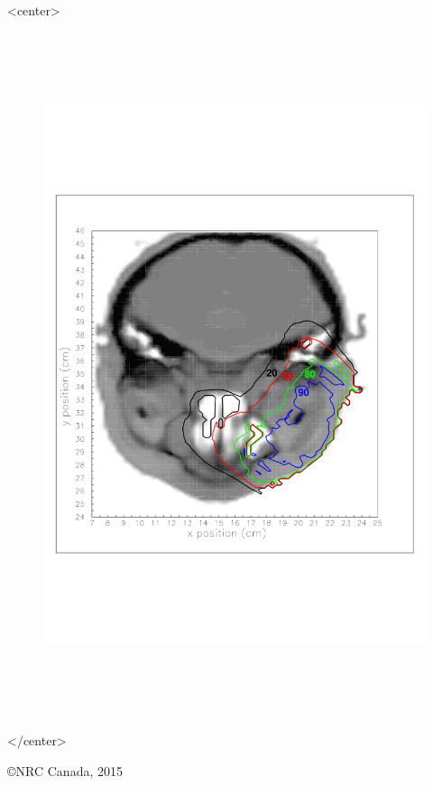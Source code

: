 \documentclass[12pt,twoside]{article}      %
\begin{document}
\begin{center}
\vspace*{-2cm}
\begin{htmlonly}       %
\begin{rawhtml}
<center>
\end{rawhtml}
\end{htmlonly}       %
\begin{figure}[H]
\begin{center}
\includegraphics[height=20cm]{figures/CT_example_msmodel}
\end{center}
\end{figure}
\begin{htmlonly}       %
\begin{rawhtml}
</center>
\end{rawhtml}
\end{htmlonly}       %


\vfill
\copyright NRC Canada, 2015
\end{center}
\end{document}
